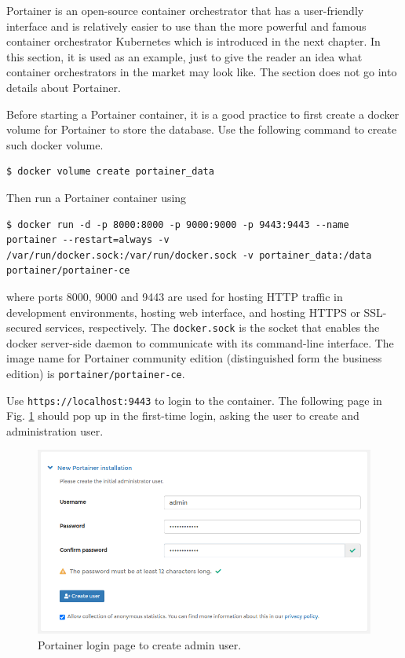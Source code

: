 Portainer is an open-source container orchestrator that has a user-friendly interface and is relatively easier to use than the more powerful and famous container orchestrator Kubernetes which is introduced in the next chapter. In this section, it is used as an example, just to give the reader an idea what container orchestrators in the market may look like. The section does not go into details about Portainer.

Before starting a Portainer container, it is a good practice to first create a docker volume for Portainer to store the database. Use the following command to create such docker volume.
\begin{lstlisting}
$ docker volume create portainer_data
\end{lstlisting}
Then run a Portainer container using
\begin{lstlisting}
$ docker run -d -p 8000:8000 -p 9000:9000 -p 9443:9443 --name portainer --restart=always -v /var/run/docker.sock:/var/run/docker.sock -v portainer_data:/data portainer/portainer-ce
\end{lstlisting}
where ports 8000, 9000 and 9443 are used for hosting HTTP traffic in development environments, hosting web interface, and hosting HTTPS or SSL-secured services, respectively. The \verb|docker.sock| is the socket that enables the docker server-side daemon to communicate with its command-line interface. The image name for Portainer community edition (distinguished form the business edition) is \verb|portainer/portainer-ce|.

Use \verb|https://localhost:9443| to login to the container. The following page in Fig. \ref{ch:vac:fig:portainerlogin} should pop up in the first-time login, asking the user to create and administration user.
\begin{figure}[htbp]
	\centering
	\includegraphics[width=350pt]{chapters/part-3/figures/portainerlogin.png}
	\caption{Portainer login page to create admin user.} \label{ch:vac:fig:portainerlogin}
\end{figure}

